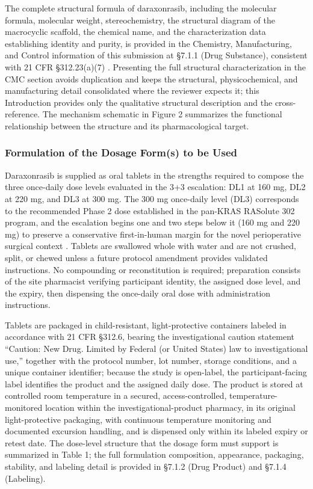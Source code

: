 The complete structural formula of daraxonrasib, including the molecular formula,
molecular weight, stereochemistry, the structural diagram of the macrocyclic
scaffold, the chemical name, and the characterization data establishing identity
and purity, is provided in the Chemistry, Manufacturing, and Control information of
this submission at \S 7.1.1 (Drug Substance), consistent with 21 CFR \S 312.23(a)(7)
\cite{phase1guidance, cfr312paiuni}. Presenting the full structural characterization
in the CMC section avoids duplication and keeps the structural, physicochemical, and
manufacturing detail consolidated where the reviewer expects it; this Introduction
provides only the qualitative structural description and the cross-reference. The
mechanism schematic in Figure 2 summarizes the functional relationship between the
structure and its pharmacological target.

\subsubsection{Formulation of the Dosage Form(s) to be Used}

Daraxonrasib is supplied as oral tablets in the strengths required to compose the
three once-daily dose levels evaluated in the 3+3 escalation: DL1 at 160 mg, DL2 at
220 mg, and DL3 at 300 mg. The 300 mg once-daily level (DL3) corresponds to the
recommended Phase 2 dose established in the pan-KRAS RASolute 302 program, and the
escalation begins one and two steps below it (160 mg and 220 mg) to preserve a
conservative first-in-human margin for the novel perioperative surgical context
\cite{daraxwhipple, onpremwhippl}. Tablets are swallowed whole with water and are
not crushed, split, or chewed unless a future protocol amendment provides validated
instructions. No compounding or reconstitution is required; preparation consists of
the site pharmacist verifying participant identity, the assigned dose level, and the
expiry, then dispensing the once-daily oral dose with administration instructions.

Tablets are packaged in child-resistant, light-protective containers labeled in
accordance with 21 CFR \S 312.6, bearing the investigational caution statement
``Caution: New Drug. Limited by Federal (or United States) law to investigational
use,'' together with the protocol number, lot number, storage conditions, and a
unique container identifier; because the study is open-label, the participant-facing
label identifies the product and the assigned daily dose. The product is stored at
controlled room temperature in a secured, access-controlled, temperature-monitored
location within the investigational-product pharmacy, in its original
light-protective packaging, with continuous temperature monitoring and documented
excursion handling, and is dispensed only within its labeled expiry or retest date.
The dose-level structure that the dosage form must support is summarized in Table 1;
the full formulation composition, appearance, packaging, stability, and labeling
detail is provided in \S 7.1.2 (Drug Product) and \S 7.1.4 (Labeling).


